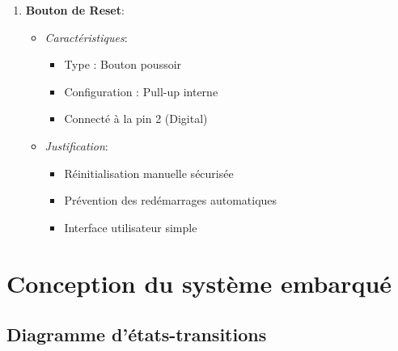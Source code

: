 \documentclass[12pt,a4paper]{article}
\begin{document}
\begin{enumerate}
\item \textbf{Bouton de Reset}:
\begin{itemize}
\item \textit{Caractéristiques}:
  \begin{itemize}
  \item Type : Bouton poussoir
  \item Configuration : Pull-up interne
  \item Connecté à la pin 2 (Digital)
  \end{itemize}
\item \textit{Justification}:
  \begin{itemize}
  \item Réinitialisation manuelle sécurisée
  \item Prévention des redémarrages automatiques
  \item Interface utilisateur simple
  \end{itemize}
\end{itemize}
\end{enumerate}

\section{Conception du système embarqué}
\subsection{Diagramme d'états-transitions}
\end{document}

